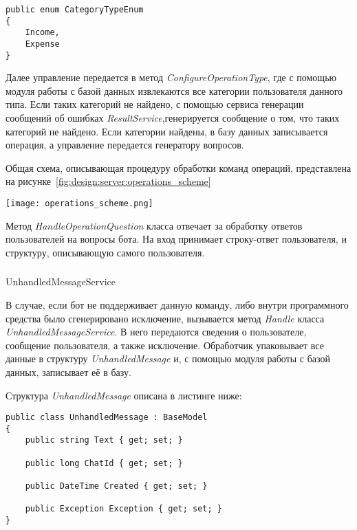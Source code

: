 \lstset{style=sharpc}
\begin{lstlisting}
public enum CategoryTypeEnum
{
	Income,
	Expense
}
\end{lstlisting}

Далее управление передается в метод \emph{ConfigureOperationType}, где с помощью модуля работы с базой данных извлекаются все категории
пользователя данного типа. Если таких категорий не найдено, с помощью сервиса генерации сообщений об ошибках \emph{ResultService},генерируется сообщение о том, что таких категорий не найдено. Если категории найдены, в базу данных записывается операция, а управление передается генератору вопросов.

Общая схема, описывающая процедуру обработки команд операций, представлена на рисунке~\ref{fig:design:server:operations_scheme}

\begin{sidewaysfigure}
\centering
	\texttt{[image: operations\_scheme.png]}
	\caption{Общая схема работы сервиса категорий}
	\label{fig:design:server:operations_scheme}
\end{sidewaysfigure}


\vskip 0.5in

Метод \emph{HandleOperationQuestion} класса отвечает за обработку ответов пользователей на вопросы бота. На вход принимает строку-ответ пользователя, и структуру, описывающую самого пользователя.

\subsubsection{} UnhandledMessageService
\label{sec:design:server:UnhandledMessageService}

В случае, если бот не поддерживает данную команду, либо внутри программного средства было сгенерировано исключение, вызывается метод \emph{Handle} класса \emph{UnhandledMessageService}. В него передаются сведения о пользователе, сообщение пользователя, а также исключение. Обработчик упаковывает все данные в структуру \emph{UnhandledMessage} и, с помощью модуля работы с базой данных, записывает её в базу. 

\vskip 0.7in

Структура \emph{UnhandledMessage} описана в листинге ниже:

\lstset{style=sharpc}
\begin{lstlisting}
public class UnhandledMessage : BaseModel
{
	public string Text { get; set; }

	public long ChatId { get; set; }

	public DateTime Created { get; set; }

	public Exception Exception { get; set; }
}
\end{lstlisting}

